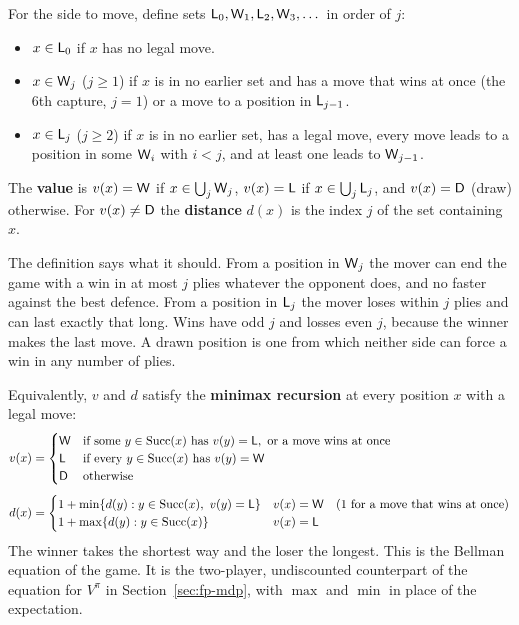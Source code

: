 \begin{definition}\label{def:wl}
For the side to move, define sets $\mathsf{L}_0, \mathsf{W}_1, \mathsf{L}_2, \mathsf{W}_3, \dots$ in order of $j$:
\begin{itemize}
\item $x \in \mathsf{L}_0$ if $x$ has no legal move.
\item $x \in \mathsf{W}_j$ ($j \ge 1$) if $x$ is in no earlier set and has a move that wins at once (the 6th capture,
  $j = 1$) or a move to a position in $\mathsf{L}_{j-1}$.
\item $x \in \mathsf{L}_j$ ($j \ge 2$) if $x$ is in no earlier set, has a legal move, every move leads to a position in
  some $\mathsf{W}_i$ with $i < j$, and at least one leads to $\mathsf{W}_{j-1}$.
\end{itemize}
The \textbf{value} is $v(x) = \mathsf{W}$ if $x \in \bigcup_j \mathsf{W}_j$, $v(x) = \mathsf{L}$ if $x \in \bigcup_j \mathsf{L}_j$, and $v(x) = \mathsf{D}$ (draw)
otherwise. For $v(x) \neq \mathsf{D}$ the \textbf{distance} $d(x)$ is the index $j$ of the set containing $x$.
\end{definition}

The definition says what it should. From a position in $\mathsf{W}_j$ the mover can end the game with a win in at
most $j$ plies whatever the opponent does, and no faster against the best defence. From a position in
$\mathsf{L}_j$ the mover loses within $j$ plies and can last exactly that long. Wins have odd $j$ and losses even
$j$, because the winner makes the last move. A drawn position is one from which neither side can force a
win in any number of plies.

Equivalently, $v$ and $d$ satisfy the \textbf{minimax recursion} at every position $x$ with a legal move:
\begin{equation}\label{eq:minimax}
\begin{aligned}
v(x) &= \begin{cases}
\mathsf{W} & \text{if some } y \in \operatorname{Succ}(x) \text{ has } v(y) = \mathsf{L}, \text{ or a move wins at once} \\
\mathsf{L} & \text{if every } y \in \operatorname{Succ}(x) \text{ has } v(y) = \mathsf{W} \\
\mathsf{D} & \text{otherwise}
\end{cases} \\[0.4em]
d(x) &= \begin{cases}
1 + \min\{d(y) : y \in \operatorname{Succ}(x),\ v(y) = \mathsf{L}\} & v(x) = \mathsf{W} \quad (\text{1 for a move that wins at once}) \\
1 + \max\{d(y) : y \in \operatorname{Succ}(x)\} & v(x) = \mathsf{L}
\end{cases}
\end{aligned}
\end{equation}
The winner takes the shortest way and the loser the longest. This is the Bellman equation of the game. It is
the two-player, undiscounted counterpart of the equation for $V^\pi$ in Section~\ref{sec:fp-mdp}, with
$\max$ and $\min$ in place of the expectation.

